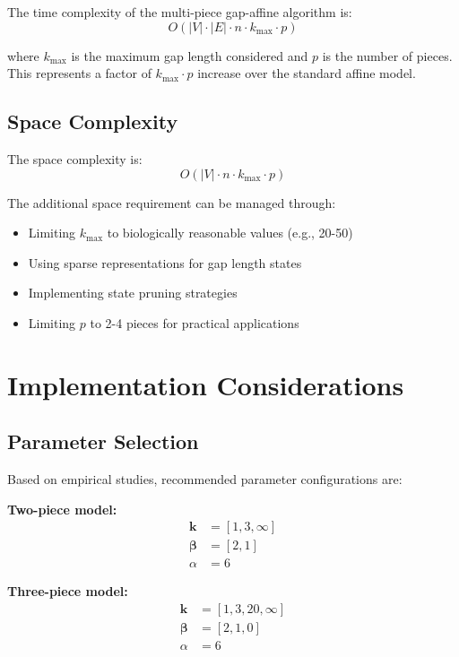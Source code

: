 \documentclass[11pt]{article}
\begin{document}
The time complexity of the multi-piece gap-affine algorithm is:
\begin{equation}
O(|V| \cdot |E| \cdot n \cdot k_{\max} \cdot p)
\end{equation}

where $k_{\max}$ is the maximum gap length considered and $p$ is the number of pieces. This represents a factor of $k_{\max} \cdot p$ increase over the standard affine model.

\subsection{Space Complexity}

The space complexity is:
\begin{equation}
O(|V| \cdot n \cdot k_{\max} \cdot p)
\end{equation}

The additional space requirement can be managed through:
\begin{itemize}
\item Limiting $k_{\max}$ to biologically reasonable values (e.g., 20-50)
\item Using sparse representations for gap length states
\item Implementing state pruning strategies
\item Limiting $p$ to 2-4 pieces for practical applications
\end{itemize}

\section{Implementation Considerations}

\subsection{Parameter Selection}

Based on empirical studies, recommended parameter configurations are:

\textbf{Two-piece model:}
\begin{align}
\mathbf{k} &= [1, 3, \infty] \\
\boldsymbol{\beta} &= [2, 1] \\
\alpha &= 6
\end{align}

\textbf{Three-piece model:}
\begin{align}
\mathbf{k} &= [1, 3, 20, \infty] \\
\boldsymbol{\beta} &= [2, 1, 0] \\
\alpha &= 6
\end{align}
\end{document}
